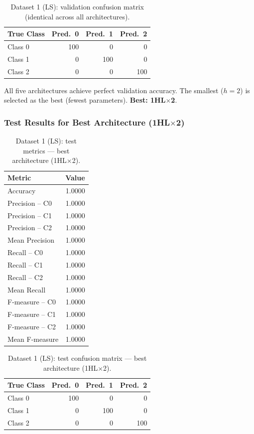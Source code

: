 \documentclass[11pt,a4paper]{article}
\begin{document}
\begin{table}[H]
\centering
\caption{Dataset 1 (LS): validation confusion matrix (identical across all architectures).}
\begin{tabular}{lrrr}
\toprule
True Class & Pred.\ 0 & Pred.\ 1 & Pred.\ 2 \\
\midrule
Class 0 & 100 & 0 & 0 \\
Class 1 & 0   & 100 & 0 \\
Class 2 & 0   & 0 & 100 \\
\bottomrule
\end{tabular}
\end{table}

All five architectures achieve perfect validation accuracy. The smallest ($h=2$) is selected as the best (fewest parameters). \textbf{Best: 1HL$\times$2}.

\subsubsection*{Test Results for Best Architecture (1HL$\times$2)}

\begin{table}[H]
\centering
\caption{Dataset 1 (LS): test metrics --- best architecture (1HL$\times$2).}
\begin{tabular}{lr}
\toprule
Metric & Value \\
\midrule
Accuracy        & 1.0000 \\
Precision -- C0 & 1.0000 \\
Precision -- C1 & 1.0000 \\
Precision -- C2 & 1.0000 \\
Mean Precision  & 1.0000 \\
Recall -- C0    & 1.0000 \\
Recall -- C1    & 1.0000 \\
Recall -- C2    & 1.0000 \\
Mean Recall     & 1.0000 \\
F-measure -- C0 & 1.0000 \\
F-measure -- C1 & 1.0000 \\
F-measure -- C2 & 1.0000 \\
Mean F-measure  & 1.0000 \\
\bottomrule
\end{tabular}
\end{table}

\begin{table}[H]
\centering
\caption{Dataset 1 (LS): test confusion matrix --- best architecture (1HL$\times$2).}
\begin{tabular}{lrrr}
\toprule
True Class & Pred.\ 0 & Pred.\ 1 & Pred.\ 2 \\
\midrule
Class 0 & 100 & 0   & 0   \\
Class 1 & 0   & 100 & 0   \\
Class 2 & 0   & 0   & 100 \\
\bottomrule
\end{tabular}
\end{table}
\end{document}
